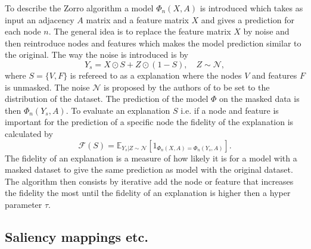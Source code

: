 
To describe the Zorro algorithm a model $\Phi_n(X,A)$ is introduced which takes as input an adjacency $A$ matrix and a feature matrix $X$ and gives a prediction for each node $n$. The general idea is to replace the feature matrix $X$ by noise and then reintroduce nodes and features which makes the model prediction similar to the original. The way the noise is introduced is by 
\begin{equation*}
    Y_s = X \odot S + Z \odot (1- S), \quad Z \sim \mathcal{N}, 
\end{equation*}
where $S = \{V, F\}$ is refereed to as a explanation where the nodes $V$ and features $F$ is unmasked. The noise $\mathcal{N}$ is proposed by the authors of \cite{} to be set to the distribution of the dataset. The prediction of the model $\Phi$ on the masked data is then $\Phi_n(Y_s, A)$. To evaluate an explanation $S$ i.e. if a node and feature is important for the prediction of a specific node the fidelity of the explanation is calculated by
\begin{equation*}
    \mathcal{F}(S) = \mathbb{E}_{Y_s|Z\sim\mathcal{N}}[1_{\Phi_n(X,A) = \Phi_n(Y_s,A)}].
\end{equation*}
The fidelity of an explanation is a measure of how likely it is for a model with a masked dataset to give the same prediction as model with the original dataset. The algorithm then consists by iterative add the node or feature that increases the fidelity the most until the fidelity of an explanation is higher then a hyper parameter $\tau$. 

\subsection{Saliency mappings etc.}


